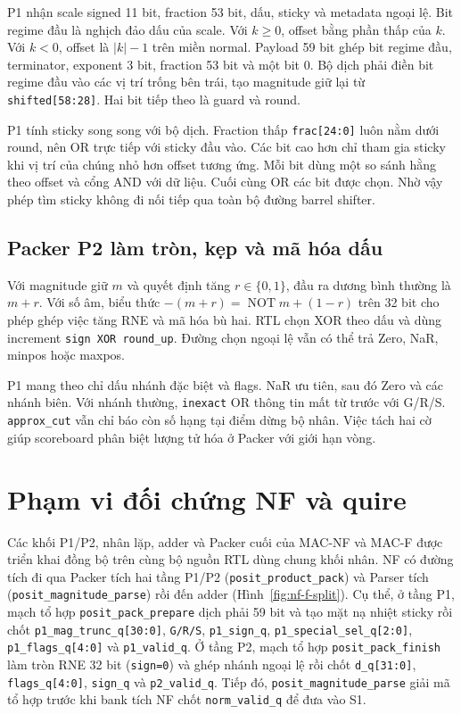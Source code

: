 P1 nhận scale signed 11 bit, fraction 53 bit, dấu, sticky và
metadata ngoại lệ. Bit regime đầu là nghịch đảo dấu của scale.
Với $k\ge0$, offset bằng phần thấp của $k$. Với $k<0$, offset
là $|k|-1$ trên miền normal. Payload 59 bit ghép bit regime đầu,
terminator, exponent 3 bit, fraction 53 bit và một bit 0.
Bộ dịch phải điền bit regime đầu vào các vị trí trống bên trái,
tạo magnitude giữ lại từ \texttt{shifted[58:28]}. Hai bit
tiếp theo là guard và round.



P1 tính sticky song song với bộ dịch. Fraction thấp
\texttt{frac[24:0]} luôn nằm dưới round, nên OR trực tiếp với
sticky đầu vào. Các bit cao hơn chỉ tham gia sticky khi vị
trí của chúng nhỏ hơn offset tương ứng. Mỗi bit dùng một so
sánh hằng theo offset và cổng AND với dữ liệu. Cuối cùng OR
các bit được chọn. Nhờ vậy phép tìm sticky không đi nối tiếp
qua toàn bộ đường barrel shifter.

\subsection{Packer P2 làm tròn, kẹp và mã hóa dấu}

Với magnitude giữ $m$ và quyết định tăng $r\in\{0,1\}$,
đầu ra dương bình thường là $m+r$. Với số âm, biểu thức
$-(m+r)=\mathop{\mathrm{NOT}}m+(1-r)$ trên 32 bit cho phép
ghép việc tăng RNE và mã hóa bù hai. RTL chọn XOR theo dấu
và dùng increment \texttt{sign XOR round\_up}. Đường chọn
ngoại lệ vẫn có thể trả Zero, NaR, minpos hoặc maxpos.

P1 mang theo chỉ dấu nhánh đặc biệt và flags. NaR ưu tiên,
sau đó Zero và các nhánh biên. Với nhánh thường,
\texttt{inexact} OR thông tin mất từ trước với G/R/S.
\texttt{approx\_cut} vẫn chỉ báo còn số hạng tại điểm dừng
bộ nhân. Việc tách hai cờ giúp scoreboard phân biệt
lượng tử hóa ở Packer với giới hạn vòng.

\section{Phạm vi đối chứng NF và quire}

Các khối P1/P2, nhân lặp, adder và Packer cuối của MAC-NF và MAC-F được
triển khai đồng bộ trên cùng bộ nguồn RTL dùng chung khối nhân. NF có đường tích đi qua
Packer tích hai tầng P1/P2 (\texttt{posit\_product\_pack}) và Parser tích
(\texttt{posit\_magnitude\_parse}) rồi đến adder (Hình~\ref{fig:nf-f-split}).
Cụ thể, ở tầng P1, mạch tổ hợp \texttt{posit\_pack\_prepare} dịch phải 59 bit
và tạo mặt nạ nhiệt sticky rồi chốt \texttt{p1\_mag\_trunc\_q[30:0]},
\texttt{G/R/S}, \texttt{p1\_sign\_q}, \texttt{p1\_special\_sel\_q[2:0]},
\texttt{p1\_flags\_q[4:0]} và \texttt{p1\_valid\_q}. Ở tầng P2, mạch tổ hợp
\texttt{posit\_pack\_finish} làm tròn RNE 32 bit (\texttt{sign=0}) và ghép nhánh
ngoại lệ rồi chốt \texttt{d\_q[31:0]}, \texttt{flags\_q[4:0]}, \texttt{sign\_q}
và \texttt{p2\_valid\_q}. Tiếp đó, \texttt{posit\_magnitude\_parse} giải mã tổ hợp
trước khi bank tích NF chốt \texttt{norm\_valid\_q} để đưa vào S1.

